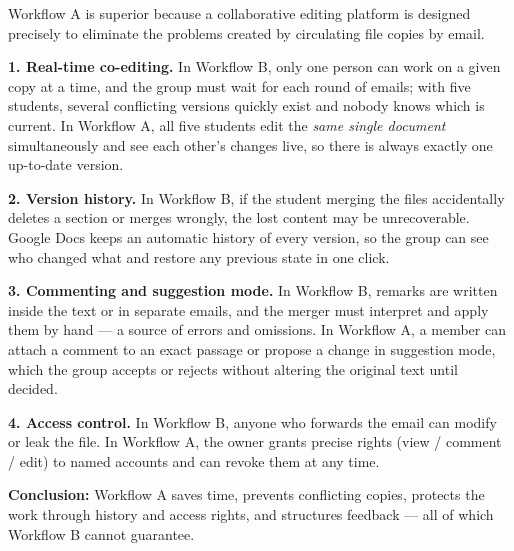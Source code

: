 \documentclass[11pt]{article}
\begin{document}
\begin{corrige}
Workflow A is superior because a collaborative editing platform is designed precisely to eliminate the problems created by circulating file copies by email.

\textbf{1. Real-time co-editing.} In Workflow B, only one person can work on a given copy at a time, and the group must wait for each round of emails; with five students, several conflicting versions quickly exist and nobody knows which is current. In Workflow A, all five students edit the \emph{same single document} simultaneously and see each other's changes live, so there is always exactly one up-to-date version.

\textbf{2. Version history.} In Workflow B, if the student merging the files accidentally deletes a section or merges wrongly, the lost content may be unrecoverable. Google Docs keeps an automatic history of every version, so the group can see who changed what and restore any previous state in one click.

\textbf{3. Commenting and suggestion mode.} In Workflow B, remarks are written inside the text or in separate emails, and the merger must interpret and apply them by hand — a source of errors and omissions. In Workflow A, a member can attach a comment to an exact passage or propose a change in suggestion mode, which the group accepts or rejects without altering the original text until decided.

\textbf{4. Access control.} In Workflow B, anyone who forwards the email can modify or leak the file. In Workflow A, the owner grants precise rights (view / comment / edit) to named accounts and can revoke them at any time.

\textbf{Conclusion:} Workflow A saves time, prevents conflicting copies, protects the work through history and access rights, and structures feedback — all of which Workflow B cannot guarantee.
\end{corrige}
\end{document}
